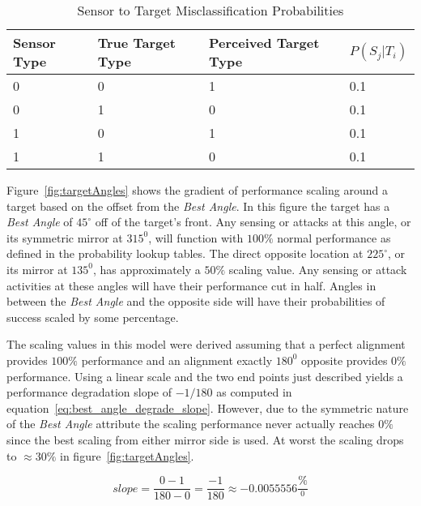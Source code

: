 \begin{table}[H]
	\caption{Sensor to Target Misclassification Probabilities}
	\centering
	\label{tab:snsrTgtMisClassProb}
	\begin{tabular}{|p{1cm}|p{1.25cm}|p{1.6cm}|p{1.5cm}|}
		\hline
		Sensor Type & True Target Type & Perceived Target Type & $P(S_{j}|T_{i})$\\ \hline
		0 & 0 & 1 & 0.1 \\ \hline
		0 & 1 & 0 & 0.1 \\ \hline
		1 & 0 & 1 & 0.1 \\ \hline
		1 & 1 & 0 & 0.1 \\ \hline
	\end{tabular}
\end{table}

Figure~\ref{fig:targetAngles} shows the gradient of performance scaling around a target based on the offset from the \textit{Best Angle}.  In this figure the target has a \textit{Best Angle} of $45^{\circ}$ off of the target's front.  Any sensing or attacks at this angle, or its symmetric mirror at $315^{0}$, will function with $100\%$ normal performance as defined in the probability lookup tables.  The direct opposite location at $225^{\circ}$, or its mirror at $135^{0}$, has approximately a $50\%$ scaling value.  Any sensing or attack activities at these angles will have their performance cut in half.  Angles in between the \textit{Best Angle} and the opposite side will have their probabilities of success scaled by some percentage.

The scaling values in this model were derived assuming that a perfect alignment provides $100\%$ performance and an alignment exactly $180^{0}$ opposite provides $0\%$ performance.  Using a linear scale and the two end points just described yields a performance degradation slope of $-1 / 180$ as computed in equation~\ref{eq:best_angle_degrade_slope}. However, due to the symmetric nature of the \textit{Best Angle} attribute the scaling performance never actually reaches $0\%$ since the best scaling from either mirror side is used.  At worst the scaling drops to $\approx30\%$ in figure~\ref{fig:targetAngles}. 

\begin{equation}
\label{eq:best_angle_degrade_slope}
slope = \frac{0 - 1}{180-0} = \frac{-1}{180} \approx -0.0055556\frac{\%}{^{0}}
\end{equation}


